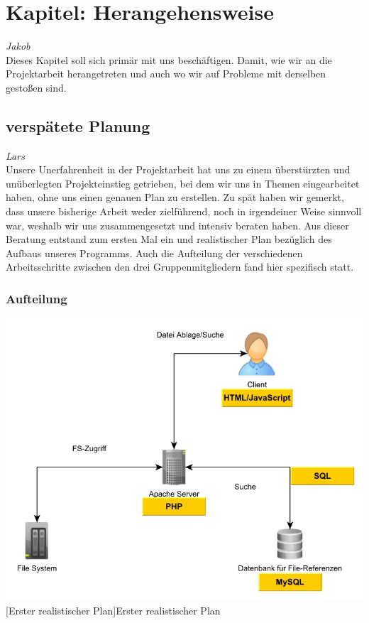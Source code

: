 \documentclass[12pt,a4paper,bibliography=totocnumbered,listof=totocnumbered]{scrartcl}
\begin{document}
\onehalfspacing
\renewcommand{\thesection}{\arabic{section}}
\renewcommand{\theHsection}{\arabic{section}}
\setcounter{section}{0}
\setcounter{page}{1}

\section{Kapitel: Herangehensweise}
\emph{Jakob}\\
Dieses Kapitel soll sich primär mit uns beschäftigen.
Damit, wie wir an die Projektarbeit herangetreten und auch wo wir auf Probleme mit derselben gestoßen sind.

\subsection{verspätete Planung}
\emph{Lars}\\
Unsere Unerfahrenheit in der Projektarbeit hat uns zu einem überstürzten und unüberlegten Projekteinstieg getrieben, bei dem wir uns in Themen eingearbeitet haben, ohne uns einen genauen Plan zu erstellen. Zu spät haben wir gemerkt, dass unsere bisherige Arbeit weder zielführend, noch in irgendeiner Weise sinnvoll war, weshalb wir uns zusammengesetzt und intensiv beraten haben. Aus dieser Beratung entstand zum ersten Mal ein und realistischer Plan bezüglich des Aufbaus unseres Programms. Auch die Aufteilung der verschiedenen Arbeitsschritte zwischen den  drei Gruppenmitgliedern fand hier spezifisch statt.

\subsubsection{Aufteilung}
\label{sec:Aufteilung}

\vspace{1em}
\begin{minipage}{\linewidth}
	\centering
	\includegraphics[width=0.7\linewidth]{Bilder/Projekt-Entwurf.jpg}
	[Erster realistischer Plan]{Erster realistischer Plan}
	\label{fig:plan1}
\end{minipage}
\vspace{1em}
\end{document}
